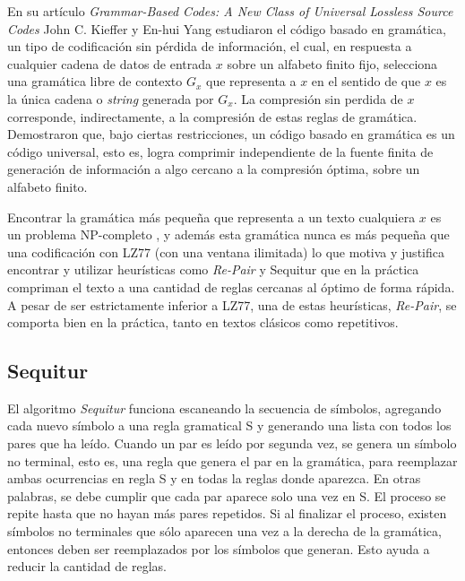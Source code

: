 En su artículo \textit{Grammar-Based Codes: A New Class of Universal Lossless Source Codes} John C. Kieffer y En-hui Yang estudiaron el código basado en gramática\cite{841160}, un tipo de codificación sin pérdida de información, el cual, en respuesta a cualquier cadena de datos de entrada $x$ sobre un alfabeto finito fijo, selecciona una gramática libre de contexto $G_x$ que representa a $x$ en el sentido de que $x$ es la única cadena o \textit{string} generada por $G_x$. La compresión sin perdida de $x$ corresponde, indirectamente, a la compresión de estas reglas de gramática. Demostraron que, bajo ciertas restricciones, un código basado en gramática es un código universal, esto es, logra comprimir independiente de la fuente finita de generación de información a algo cercano a la compresión óptima, sobre un alfabeto finito. 

Encontrar la gramática más pequeña que representa a un texto cualquiera $x$ es un problema NP-completo \cite{Charikar2005}\cite{Rytter2003}, y además esta gramática nunca es más pequeña que una codificación con LZ77\cite{LZ77} (con una ventana ilimitada) lo que motiva y justifica encontrar y utilizar heurísticas como \textit{Re-Pair}\cite{Larsson2000} y Sequitur\cite{NevillManning1997} que en la práctica compriman el texto a una cantidad de reglas cercanas al óptimo de forma rápida. A pesar de ser estrictamente inferior a LZ77, una de estas heurísticas, \textit{Re-Pair}, se comporta bien en la práctica, tanto en textos clásicos como repetitivos.

\subsection{Sequitur}

El algoritmo \textit{Sequitur}\cite{NevillManning1997} funciona escaneando la secuencia de símbolos, agregando cada nuevo símbolo a una regla gramatical S y generando una lista con todos los pares que ha leído. Cuando un par es leído por segunda vez, se genera un símbolo no terminal, esto es, una regla que genera el par en la gramática, para reemplazar ambas ocurrencias en regla S y en todas la reglas donde aparezca. En otras palabras, se debe cumplir que cada par aparece solo una vez en S. El proceso se repite hasta que no hayan más pares repetidos. Si al finalizar el proceso, existen símbolos no terminales que sólo aparecen una vez a la derecha de la gramática, entonces deben ser reemplazados por los símbolos que generan. Esto ayuda a reducir la cantidad de reglas.

